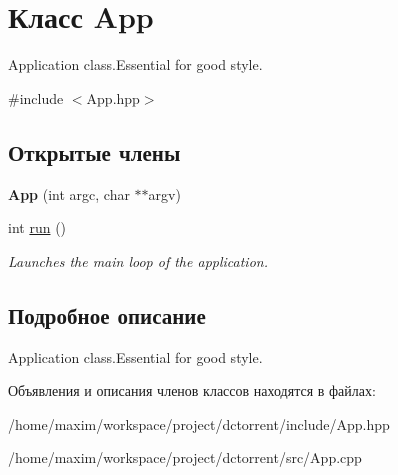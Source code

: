 \hypertarget{class_app}{}\section{Класс App}
\label{class_app}


Application class.\+Essential for good style.  




{\ttfamily \#include $<$App.\+hpp$>$}

\subsection*{Открытые члены}
\begin{DoxyCompactItemize}
\item 
\mbox{\label{class_app_ac94bd74b1c19faaf5c62e3b14e6b10c5}} 
{\bfseries App} (int argc, char $\ast$$\ast$argv)
\item 
\mbox{\label{class_app_a8d27eeb51b813760dc39425d7a9a37e2}} 
int \hyperlink{class_app_a8d27eeb51b813760dc39425d7a9a37e2}{run} ()
\begin{DoxyCompactList}\small\item\em Launches the main loop of the application. \end{DoxyCompactList}\end{DoxyCompactItemize}


\subsection{Подробное описание}
Application class.\+Essential for good style. 

Объявления и описания членов классов находятся в файлах\+:\begin{DoxyCompactItemize}
\item 
/home/maxim/workspace/project/dctorrent/include/App.\+hpp\item 
/home/maxim/workspace/project/dctorrent/src/App.\+cpp\end{DoxyCompactItemize}
